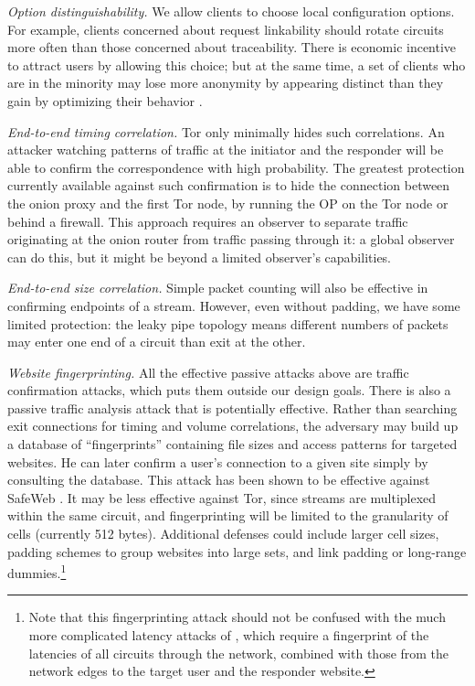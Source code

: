 \documentclass[times,10pt,twocolumn]{article}
\begin{document}
\emph{Option distinguishability.} We allow clients to choose local
configuration options. For example, clients concerned about request
linkability should rotate circuits more often than those concerned
about traceability. There is economic incentive to attract users by
allowing this choice; but at the same time, a set of clients who are
in the minority may lose more anonymity by appearing distinct than they
gain by optimizing their behavior \cite{econymics}.

\emph{End-to-end timing correlation.}  Tor only minimally hides
such correlations. An attacker watching patterns of
traffic at the initiator and the responder will be
able to confirm the correspondence with high probability. The
greatest protection currently available against such confirmation is to hide
the connection between the onion proxy and the first Tor node,
by running the OP on the Tor node or behind a firewall. This approach
requires an observer to separate traffic originating at the onion
router from traffic passing through it: a global observer can do this,
but it might be beyond a limited observer's capabilities.

\emph{End-to-end size correlation.} Simple packet counting
will also be effective in confirming
endpoints of a stream. However, even without padding, we have some
limited protection: the leaky pipe topology means different numbers
of packets may enter one end of a circuit than exit at the other.

\emph{Website fingerprinting.} All the effective passive
attacks above are traffic confirmation attacks,
which puts them outside our design goals. There is also
a passive traffic analysis attack that is potentially effective.
Rather than searching exit connections for timing and volume
correlations, the adversary may build up a database of
``fingerprints'' containing file sizes and access patterns for
targeted websites. He can later confirm a user's connection to a given
site simply by consulting the database. This attack has
been shown to be effective against SafeWeb \cite{hintz-pet02}.
It may be less effective against Tor, since
streams are multiplexed within the same circuit, and
fingerprinting will be limited to
the granularity of cells (currently 512 bytes). Additional
defenses could include
larger cell sizes, padding schemes to group websites
into large sets, and link
padding or long-range dummies.\footnote{Note that this fingerprinting
attack should not be confused with the much more complicated latency
attacks of \cite{back01}, which require a fingerprint of the latencies
of all circuits through the network, combined with those from the
network edges to the target user and the responder website.}\\
\end{document}
